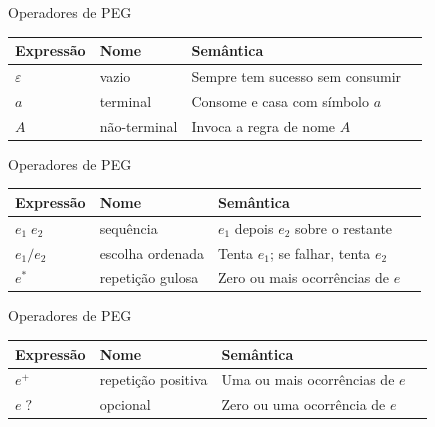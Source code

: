 \begin{frame}{Operadores de PEG}

    \begin{table}
        \begin{tabular}{l l l l}
            \hline
            Expressão & Nome & Semântica \\
            \hline
            \(\varepsilon\) & vazio & Sempre tem sucesso sem consumir \\
            \(a\) & terminal & Consome e casa com símbolo \(a\) \\
            \(A\) & não-terminal & Invoca a regra de nome \(A\) \\
            \hline
        \end{tabular}
    \end{table}
\end{frame}

\begin{frame}{Operadores de PEG}

    \begin{table}
        \begin{tabular}{l l l l}
            \hline
            Expressão & Nome & Semântica \\
            \hline
            \(e_1\; e_2\) & sequência & \(e_1\) depois \(e_2\) sobre o restante \\
            \(e_1 / e_2\) & escolha ordenada & Tenta \(e_1\); se falhar, tenta
            \(e_2\) \\
            \(e^*\) & repetição gulosa & Zero ou mais ocorrências de \(e\) \\
            \hline
        \end{tabular}
    \end{table}
\end{frame}

\begin{frame}{Operadores de PEG}

    \begin{table}
        \begin{tabular}{l l l l}
            \hline
            Expressão & Nome & Semântica \\
            \hline
            \(e^+\) & repetição positiva & Uma ou mais ocorrências de \(e\) \\
            \(e\;?\) & opcional & Zero ou uma ocorrência de \(e\) \\
            \hline
        \end{tabular}
    \end{table}
\end{frame}

